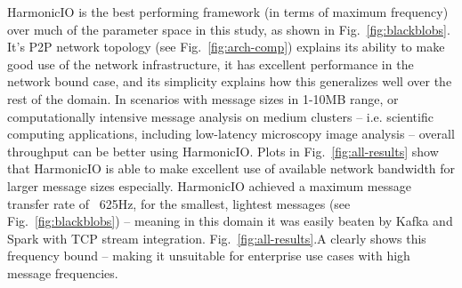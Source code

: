 \documentclass[letterpaper,conference]{IEEEtran}
\begin{document}

HarmonicIO is the best performing framework (in terms of maximum frequency) over much of the parameter space in this study, as shown in Fig.~\ref{fig:blackblobs}. 
It's P2P network topology (see Fig.~\ref{fig:arch-comp}) explains its ability to make good use of the network infrastructure, it has excellent performance in the network bound case, and its simplicity explains how this generalizes well over the rest of the domain. In scenarios with message sizes in 1-10MB range, or computationally intensive message analysis on medium clusters -- i.e. scientific computing applications, including low-latency microscopy image analysis -- overall throughput can be better using HarmonicIO. Plots in Fig.~\ref{fig:all-results} show that HarmonicIO is able to make excellent use of available network bandwidth for larger message sizes especially.
HarmonicIO achieved a maximum message transfer rate of ~625Hz, for the smallest, lightest messages (see Fig.~\ref{fig:blackblobs}) -- meaning in this domain it was easily beaten by Kafka and Spark with TCP stream integration. Fig.~\ref{fig:all-results}.A clearly shows this frequency bound -- making it unsuitable for enterprise use cases with high message frequencies.


\end{document}
